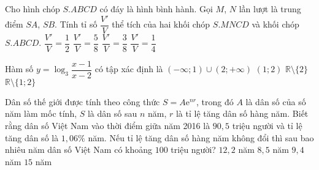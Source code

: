 \begin{ex}
	Cho hình chóp $S.ABCD$ có đáy là hình bình hành. Gọi $M$, $N$ lần lượt là trung điểm $SA$, $SB$. Tính tỉ số $\dfrac{V'}{V}$ thể tích của hai khối chóp $S.MNCD$ và khối chóp $S.ABCD$.
	\choice
	{$\dfrac{V'}{V}=\dfrac{1}{2}$}
	{$\dfrac{V'}{V}=\dfrac{5}{8}$}
	{\True $\dfrac{V'}{V}=\dfrac{3}{8}$}
	{$\dfrac{V'}{V}=\dfrac{1}{4}$}
\end{ex}
\begin{ex}
	Hàm số $y=\log_3\dfrac{x-1}{x-2}$ có tập xác định là
	\choice
	{\True $(-\infty;1)\cup(2;+\infty)$}
	{$(1;2)$}
	{$\mathbb{R}\setminus\{2\}$}
	{$\mathbb{R}\setminus\{1;2\}$}
\end{ex}
\begin{ex}
	Dân số thế giới được tính theo công thức $S=A\mathrm{e}^{nr}$, trong đó $A$ là dân số của số năm làm mốc tính, $S$ là dân số sau $n$ năm, $r$ là tỉ lệ tăng dân số hàng năm. Biết rằng dân số Việt Nam vào thời điểm giữa năm 2016 là $90,5$ triệu người và tỉ lệ tăng dân số là $1,06\%$ năm. Nếu tỉ lệ tăng dân số hàng năm không đổi thì sau bao nhiêu năm dân số Việt Nam có khoảng $100$ triệu người?
	\choice
	{$12,2$ năm}
	{$8,5$ năm}
	{\True $9,4$ năm}
	{$15$ năm}
\end{ex}
